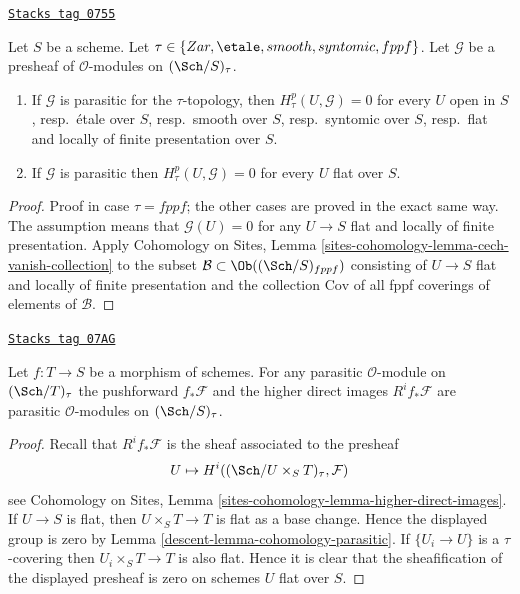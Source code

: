 \begin{lemma}
\label{descent-lemma-cohomology-parasitic}
\href{https://stacks.math.columbia.edu/tag/0755}{\texttt{Stacks tag 0755}}

Let $S$ be a scheme. Let $\tau \in \{Zar, \etale, smooth,
syntomic, fppf\}$. Let $\mathcal{G}$ be a presheaf of
$\mathcal{O}$-modules on $(\Sch/S)_\tau$.
\begin{enumerate}
\item If $\mathcal{G}$ is parasitic for the $\tau$-topology, then
$H^p_\tau(U, \mathcal{G}) = 0$ for every $U$ open in $S$,
resp.\ \'etale over $S$,
resp.\ smooth over $S$,
resp.\ syntomic over $S$,
resp.\ flat and locally of finite presentation over $S$.
\item If $\mathcal{G}$ is parasitic then $H^p_\tau(U, \mathcal{G}) = 0$
for every $U$ flat over $S$.
\end{enumerate}
\end{lemma}

\begin{proof}
Proof in case $\tau = fppf$; the other cases are proved in the
exact same way. The assumption means that $\mathcal{G}(U) = 0$ for any
$U \to S$ flat and locally of finite presentation. Apply
Cohomology on Sites, Lemma \ref{sites-cohomology-lemma-cech-vanish-collection}
to the subset $\mathcal{B} \subset \Ob((\Sch/S)_{fppf})$ consisting
of $U \to S$ flat and locally of finite presentation and the collection
$\text{Cov}$ of all fppf coverings of elements of $\mathcal{B}$.
\end{proof}

\begin{lemma}
\label{descent-lemma-direct-image-parasitic}
\href{https://stacks.math.columbia.edu/tag/07AG}{\texttt{Stacks tag 07AG}}

Let $f : T \to S$ be a morphism of schemes. For any parasitic
$\mathcal{O}$-module on $(\Sch/T)_\tau$ the pushforward
$f_*\mathcal{F}$ and the higher direct images $R^if_*\mathcal{F}$
are parasitic $\mathcal{O}$-modules on $(\Sch/S)_\tau$.
\end{lemma}

\begin{proof}

Recall that $R^if_*\mathcal{F}$ is the sheaf associated to the
presheaf
$$
U \mapsto H^i((\Sch/U \times_S T)_\tau, \mathcal{F})
$$
see
Cohomology on Sites, Lemma \ref{sites-cohomology-lemma-higher-direct-images}.
If $U \to S$ is flat, then $U \times_S T \to T$ is flat as a base change.
Hence the displayed group is zero by
Lemma \ref{descent-lemma-cohomology-parasitic}.
If $\{U_i \to U\}$ is a $\tau$-covering then
$U_i \times_S T \to T$ is also flat.
Hence it is clear that the sheafification of the displayed
presheaf is zero on schemes $U$ flat over $S$.
\end{proof}

